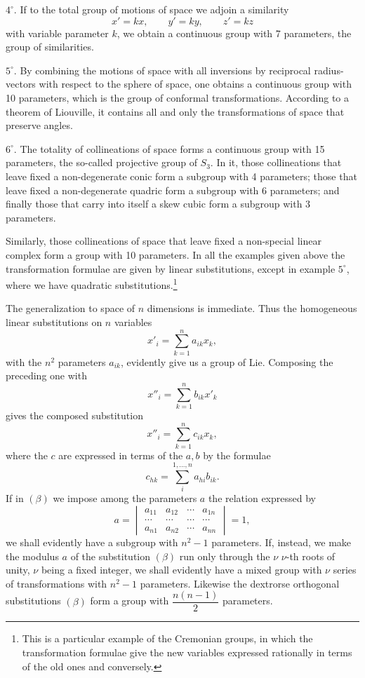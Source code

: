 \documentclass[11pt]{book}
\begin{document}
$4^{\circ}$. If to the total group of motions of space we adjoin a similarity
\[
 x'=kx,
 \qquad y'=ky,
 \qquad z'=kz
\]
with variable parameter $k$, we obtain a continuous group with 7 parameters, the group of similarities.

$5^{\circ}$. By combining the motions of space with all inversions by reciprocal radius-vectors with respect to the sphere of space, one obtains a continuous group with 10 parameters, which is the group of conformal transformations. According to a theorem of Liouville, it contains all and only the transformations of space that preserve angles.

$6^{\circ}$. The totality of collineations of space forms a continuous group with 15 parameters, the so-called projective group of $S_3$. In it, those collineations that leave fixed a non-degenerate conic form a subgroup with 4 parameters; those that leave fixed a non-degenerate quadric form a subgroup with 6 parameters; and finally those that carry into itself a skew cubic form a subgroup with 3 parameters.

Similarly, those collineations of space that leave fixed a non-special linear complex form a group with 10 parameters. In all the examples given above the transformation formulae are given by linear substitutions, except in example $5^{\circ}$, where we have quadratic substitutions.\footnote{This is a particular example of the Cremonian groups, in which the transformation formulae give the new variables expressed rationally in terms of the old ones and conversely.}

The generalization to space of $n$ dimensions is immediate. Thus the homogeneous linear substitutions on $n$ variables
\begin{equation*}\tag{$\beta$}
 x'_i=\sum\limits_{k=1}^n a_{ik}x_k,
\end{equation*}
with the $n^2$ parameters $a_{ik}$, evidently give us a group of Lie. Composing the preceding one with
\[
 x''_i=\sum\limits_{k=1}^n b_{ik}x'_k
\]
gives the composed substitution
\[
 x''_i=\sum\limits_{k=1}^n c_{ik}x_k,
\]
where the $c$ are expressed in terms of the $a,b$ by the formulae
\[
 c_{hk}=\sum\limits_i^{1,\ldots,n} a_{hi}b_{ik}.
\]
If in $(\beta)$ we impose among the parameters $a$ the relation expressed by
\[
 a=\begin{vmatrix}
 a_{11}&a_{12}&\cdots&a_{1n}\\
 \cdots&\cdots&\cdots&\cdots\\
 a_{n1}&a_{n2}&\cdots&a_{nn}
\end{vmatrix}=1,
\]
we shall evidently have a subgroup with $n^2-1$ parameters. If, instead, we make the modulus $a$ of the substitution $(\beta)$ run only through the $\nu$ $\nu$-th roots of unity, $\nu$ being a fixed integer, we shall evidently have a mixed group with $\nu$ series of transformations with $n^2-1$ parameters. Likewise the dextrorse orthogonal substitutions $(\beta)$ form a group with $\dfrac{n(n-1)}{2}$ parameters.
\end{document}
